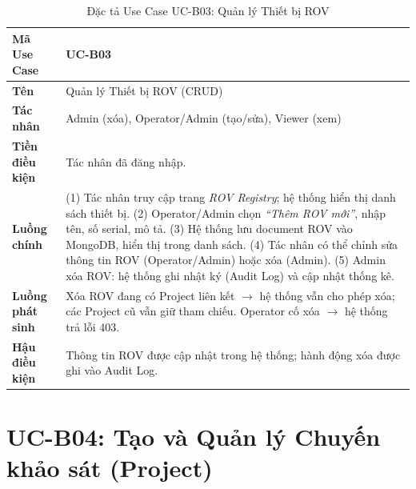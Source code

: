 \documentclass[../DoAn.tex]{subfiles}
\begin{document}
\begin{longtable}{|p{3.5cm}|p{10.0cm}|}
\caption{Đặc tả Use Case UC-B03: Quản lý Thiết bị ROV}\label{tab:ucb03}\\
\hline
\textbf{Mã Use Case} & UC-B03 \\
\hline
\textbf{Tên} & Quản lý Thiết bị ROV (CRUD) \\
\hline
\textbf{Tác nhân} & Admin (xóa), Operator/Admin (tạo/sửa), Viewer (xem) \\
\hline
\textbf{Tiền điều kiện} & Tác nhân đã đăng nhập. \\
\hline
\textbf{Luồng chính} &
(1) Tác nhân truy cập trang \textit{ROV Registry}; hệ thống hiển thị danh sách thiết bị. \newline
(2) Operator/Admin chọn \textit{``Thêm ROV mới''}, nhập tên, số serial, mô tả. \newline
(3) Hệ thống lưu document ROV vào MongoDB, hiển thị trong danh sách. \newline
(4) Tác nhân có thể chỉnh sửa thông tin ROV (Operator/Admin) hoặc xóa (Admin). \newline
(5) Admin xóa ROV: hệ thống ghi nhật ký (Audit Log) và cập nhật thống kê. \\
\hline
\textbf{Luồng phát sinh} & Xóa ROV đang có Project liên kết $\to$ hệ thống vẫn cho phép xóa; các Project cũ vẫn giữ tham chiếu. Operator cố xóa $\to$ hệ thống trả lỗi 403. \\
\hline
\textbf{Hậu điều kiện} & Thông tin ROV được cập nhật trong hệ thống; hành động xóa được ghi vào Audit Log. \\
\hline
\end{longtable}

\section{UC-B04: Tạo và Quản lý Chuyến khảo sát (Project)}
\end{document}
